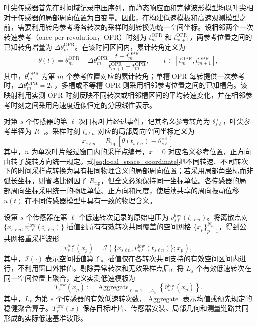 \documentclass[UTF8,12pt,a4paper]{ctexart}
\begin{document}
叶尖传感器首先在时间域记录电压序列，而静态响应面和完整波形模型均以叶尖相对于传感器的局部周向位置为自变量。因此，在构建低速模板和高速观测模型之前，需要利用转角参考将各转次的采样时刻转换为统一空间坐标。设相邻两个一次转速参考（once-per-revolution，OPR）时刻为 $t_m^{\mathrm{OPR}}$ 和 $t_{m+1}^{\mathrm{OPR}}$，两参考位置之间的已知转角增量为 $\Delta\theta_m^{\mathrm{OPR}}$。在该时间区间内，累计转角定义为
\begin{equation}
\theta(t)=\theta_m^{\mathrm{OPR}}
+\Delta\theta_m^{\mathrm{OPR}}
\frac{t-t_m^{\mathrm{OPR}}}
{t_{m+1}^{\mathrm{OPR}}-t_m^{\mathrm{OPR}}},
\qquad
t\in[t_m^{\mathrm{OPR}},t_{m+1}^{\mathrm{OPR}}],
\label{eq:time_to_angle}
\end{equation}
其中，$\theta_m^{\mathrm{OPR}}$ 为第 $m$ 个参考位置对应的累计转角；单槽 OPR 每转提供一次参考时，$\Delta\theta_m^{\mathrm{OPR}}=2\pi$，多槽或不等槽 OPR 则采用相邻参考位置之间的已知槽角。该映射利用实测 OPR 时刻反映不同转次或相邻槽区间的平均转速变化，并在相邻参考时刻之间采用角速度近似恒定的分段线性表示。

对第 $s$ 个传感器的第 $\ell$ 次目标叶片经过事件，记其名义参考转角为 $\theta_{s\ell}^{\mathrm{ref}}$，叶尖参考半径为 $R_{\mathrm{tip}}$。采样时刻 $t_{s\ell n}$ 对应的局部周向空间坐标定义为
\begin{equation}
x_{s\ell n}
=R_{\mathrm{tip}}
\left[\theta(t_{s\ell n})-\theta_{s\ell}^{\mathrm{ref}}\right].
\label{eq:local_space_coordinate}
\end{equation}
其中，$n$ 为单次叶片经过窗口内的采样点编号，$x=0$ 对应名义参考位置，正方向由转子旋转方向统一规定。式\eqref{eq:local_space_coordinate}把不同转速、不同转次下的时间采样点转换为具有相同物理含义的局部周向位置；若采用局部角坐标而非弧长坐标，则省略比例因子 $R_{\mathrm{tip}}$，但全文必须保持同一坐标单位。各传感器的局部周向坐标采用统一的物理单位、正方向和尺度，使后续共享的周向振动位移 $u(t)$ 在不同传感器模型中具有一致的物理含义。

设第 $s$ 个传感器在第 $\ell$ 个低速转次记录的原始电压为 $v_{s\ell}^{\mathrm{low}}(t_{s\ell n})$。将离散点对 $\{x_{s\ell n},v_{s\ell}^{\mathrm{low}}(t_{s\ell n})\}$ 插值到所有有效转次共同覆盖的空间网格 $\{x_p\}_{p=1}^{N_x}$，得到公共网格重采样波形
\begin{equation}
\overline v_{s\ell}^{\mathrm{low}}(x_p)
=\mathcal I
\left(
\{x_{s\ell n},v_{s\ell}^{\mathrm{low}}(t_{s\ell n})\};x_p
\right),
\label{eq:spatial_resampling}
\end{equation}
其中，$\mathcal I(\cdot)$ 表示空间插值算子。插值仅在各转次共同支持的有效空间区间内进行，不利用窗口外推值。剔除异常转次和无效采样点后，将 $L_s$ 个有效低速转次在同一空间位置上聚合，定义实测低速模板为
\begin{equation}
T_s^{\mathrm{low}}(x_p)
:=\operatorname{Aggregate}_{\ell=1,\ldots,L_s}
\left\{\overline v_{s\ell}^{\mathrm{low}}(x_p)\right\}.
\label{eq:low_template}
\end{equation}
其中，$L_s$ 为第 $s$ 个传感器的有效低速转次数，$\operatorname{Aggregate}$ 表示均值或预先规定的稳健聚合算子。$T_s^{\mathrm{low}}(x)$ 保存目标叶片、传感器安装、局部几何和测量链路共同形成的实际低速基准波形。
\end{document}
